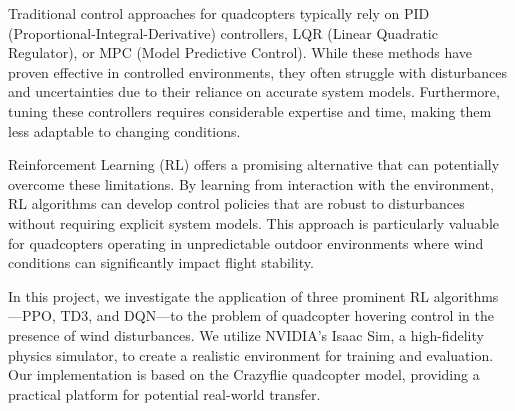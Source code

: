 \documentclass[12pt]{article}
\begin{document}

Traditional control approaches for quadcopters typically rely on PID (Proportional-Integral-Derivative) controllers, LQR (Linear Quadratic Regulator), or MPC (Model Predictive Control). While these methods have proven effective in controlled environments, they often struggle with disturbances and uncertainties due to their reliance on accurate system models. Furthermore, tuning these controllers requires considerable expertise and time, making them less adaptable to changing conditions.


Reinforcement Learning (RL) offers a promising alternative that can potentially overcome these limitations. By learning from interaction with the environment, RL algorithms can develop control policies that are robust to disturbances without requiring explicit system models. This approach is particularly valuable for quadcopters operating in unpredictable outdoor environments where wind conditions can significantly impact flight stability.


In this project, we investigate the application of three prominent RL algorithms—PPO, TD3, and DQN—to the problem of quadcopter hovering control in the presence of wind disturbances. We utilize NVIDIA's Isaac Sim, a high-fidelity physics simulator, to create a realistic environment for training and evaluation. Our implementation is based on the Crazyflie quadcopter model, providing a practical platform for potential real-world transfer.

\end{document}
